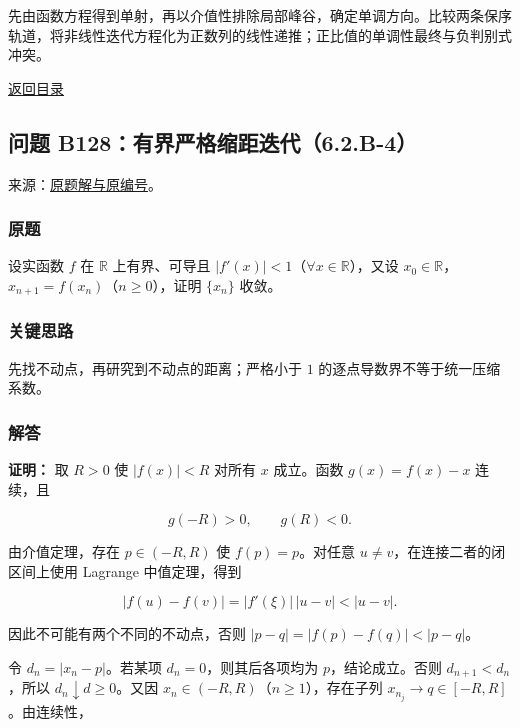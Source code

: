 \documentclass[11pt,a4paper]{article}
\begin{document}
先由函数方程得到单射，再以介值性排除局部峰谷，确定单调方向。比较两条保序轨道，将非线性迭代方程化为正数列的线性递推；正比值的单调性最终与负判别式冲突。

\noindent\hyperref[contents]{返回目录}

\subsection{问题
B128：有界严格缩距迭代（6.2.B-4）}\label{ux95eeux9898-b128ux6709ux754cux4e25ux683cux7f29ux8dddux8fedux4ee36.2.b-4}

来源：\href{https://zj139.github.io/math-notes/problems/b69d1a64f6e3c089263e7de7/\#问题-b128}{原题解与原编号}。

\subsubsection{原题}\label{ux539fux9898-13}

设实函数 \(f\) 在 \(\mathbb R\) 上有界、可导且
\(|f'(x)|<1\)（\(\forall x\in\mathbb R\)），又设
\(x_0\in\mathbb R\)，\(x_{n+1}=f(x_n)\)（\(n\ge0\)），证明 \(\{x_n\}\)
收敛。

\subsubsection{关键思路}\label{ux5173ux952eux601dux8def-13}

先找不动点，再研究到不动点的距离；严格小于 \(1\)
的逐点导数界不等于统一压缩系数。

\subsubsection{解答}\label{ux89e3ux7b54-13}

\textbf{证明：} 取 \(R>0\) 使 \(|f(x)|<R\) 对所有 \(x\) 成立。函数
\(g(x)=f(x)-x\) 连续，且

\[
g(-R)>0,\qquad g(R)<0.
\]

由介值定理，存在 \(p\in(-R,R)\) 使 \(f(p)=p\)。对任意
\(u\ne v\)，在连接二者的闭区间上使用 Lagrange 中值定理，得到

\[
|f(u)-f(v)|=|f'(\xi)|\,|u-v|<|u-v|.
\]

因此不可能有两个不同的不动点，否则 \(|p-q|=|f(p)-f(q)|<|p-q|\)。

令 \(d_n=|x_n-p|\)。若某项 \(d_n=0\)，则其后各项均为
\(p\)，结论成立。否则 \(d_{n+1}<d_n\)，所以
\(d_n\downarrow d\ge0\)。又因 \(x_n\in(-R,R)\)（\(n\ge1\)），存在子列
\(x_{n_j}\to q\in[-R,R]\)。由连续性，
\end{document}
